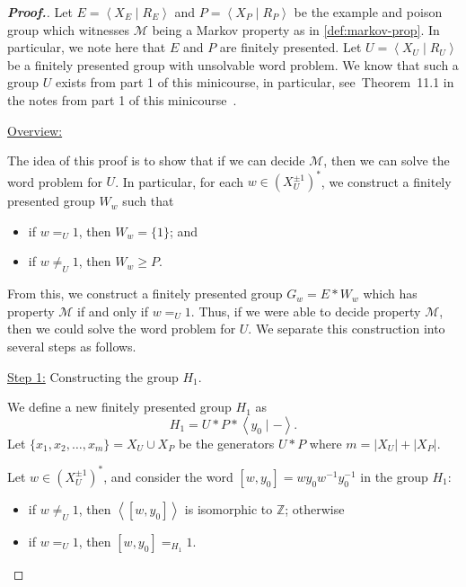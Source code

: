 \documentclass[11pt,a4paper,reqno]{amsart}
\theoremstyle{plain}
\theoremstyle{definition}
\theoremstyle{definition}
\renewcommand\geq\geqslant
\newenvironment{myproof}{\begin{proof}[\normalfont\bfseries Proof.]}{\end{proof}}
\begin{document}
\begin{myproof}
	Let $E = \left\langle X_E \mid R_E \right\rangle$ and $P = \left\langle X_P \mid R_P \right\rangle$ be the example and poison group which witnesses $\mathcal M$ being a Markov property as in \cref{def:markov-prop}.
	In particular, we note here that $E$ and $P$ are finitely presented.
	Let $U = \left\langle X_U \mid R_U\right\rangle$ be a finitely presented group with unsolvable word problem.
  We know that such a group $U$ exists from part 1 of this minicourse, in particular, see~Theorem~11.1 in the notes from part 1 of this minicourse~\cite{minicoursePart1}.

	\medskip

	\noindent
	\underline{Overview:}

	\smallskip
	\noindent
	The idea of this proof is to show that if we can decide $\mathcal M$, then we can solve the word problem for $U$.
	In particular, for each $w\in (X^{\pm 1}_U)^*$, we construct a finitely presented group $W_w$ such that
	\begin{itemize}
		\item if $w=_U 1$, then $W_w = \{1\}$; and
		\item if $w\neq_U 1$, then $W_w\geq P$.
	\end{itemize}
	From this, we construct a finitely presented group $G_w = E*W_w$ which has property $\mathcal M$ if and only if $w =_U 1$.
	Thus, if we were able to decide property $\mathcal M$, then we could solve the word problem for $U$.
	We separate this construction into several steps as follows.

	\medskip

	\noindent
	\underline{Step 1:} Constructing the group $H_1$.

	\smallskip
	\noindent
	We define a new finitely presented group $H_1$ as
	\[
		H_1
		=
		U * P * \left\langle y_0 \mid - \right\rangle.
	\]
	Let $\{x_1,x_2,\ldots,x_m\} = X_U \cup X_P$ be the generators $U * P$ where $m = |X_U| + |X_P|$.

  Let $w\in (X^{\pm 1}_U)^*$, and consider the word $[w,y_0] = w y_0 w^{-1} y_0^{-1}$ in the group $H_1$:
	\begin{itemize}
		\item if $w\neq_U 1$, then $\left\langle [w,y_0] \right\rangle$ is isomorphic to $\mathbb Z$; otherwise
		\item if $w=_U 1$, then $[w,y_0] =_{H_1} 1$.
	\end{itemize}


\end{myproof}
\end{document}
